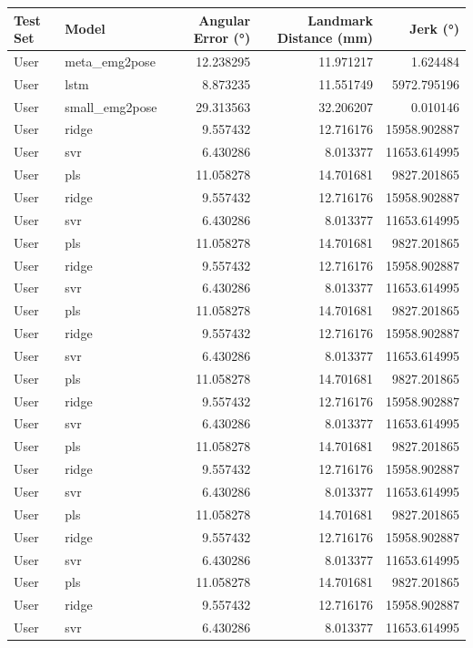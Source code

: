 \begin{tabular}{llrrr}
\toprule
Test Set & Model & Angular Error (°) & Landmark Distance (mm) & Jerk (°) \\
\midrule
User & meta_emg2pose & 12.238295 & 11.971217 & 1.624484 \\
User & lstm & 8.873235 & 11.551749 & 5972.795196 \\
User & small_emg2pose & 29.313563 & 32.206207 & 0.010146 \\
User & ridge & 9.557432 & 12.716176 & 15958.902887 \\
User & svr & 6.430286 & 8.013377 & 11653.614995 \\
User & pls & 11.058278 & 14.701681 & 9827.201865 \\
User & ridge & 9.557432 & 12.716176 & 15958.902887 \\
User & svr & 6.430286 & 8.013377 & 11653.614995 \\
User & pls & 11.058278 & 14.701681 & 9827.201865 \\
User & ridge & 9.557432 & 12.716176 & 15958.902887 \\
User & svr & 6.430286 & 8.013377 & 11653.614995 \\
User & pls & 11.058278 & 14.701681 & 9827.201865 \\
User & ridge & 9.557432 & 12.716176 & 15958.902887 \\
User & svr & 6.430286 & 8.013377 & 11653.614995 \\
User & pls & 11.058278 & 14.701681 & 9827.201865 \\
User & ridge & 9.557432 & 12.716176 & 15958.902887 \\
User & svr & 6.430286 & 8.013377 & 11653.614995 \\
User & pls & 11.058278 & 14.701681 & 9827.201865 \\
User & ridge & 9.557432 & 12.716176 & 15958.902887 \\
User & svr & 6.430286 & 8.013377 & 11653.614995 \\
User & pls & 11.058278 & 14.701681 & 9827.201865 \\
User & ridge & 9.557432 & 12.716176 & 15958.902887 \\
User & svr & 6.430286 & 8.013377 & 11653.614995 \\
User & pls & 11.058278 & 14.701681 & 9827.201865 \\
User & ridge & 9.557432 & 12.716176 & 15958.902887 \\
User & svr & 6.430286 & 8.013377 & 11653.614995 \\

\end{tabular}
